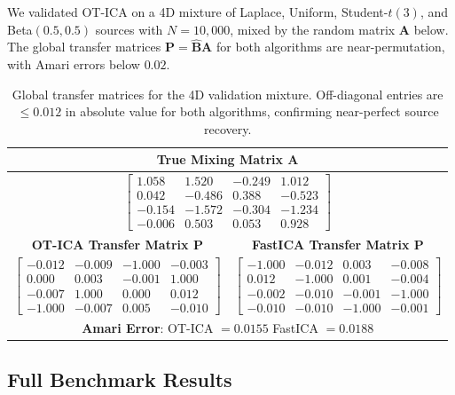\documentclass[accepted]{tpm2026} %
\begin{document}
We validated OT-ICA on a 4D mixture of Laplace, Uniform, Student-$t(3)$, and Beta$(0.5, 0.5)$ sources with $N=10{,}000$, mixed by the random matrix $\mathbf{A}$ below. The global transfer matrices $\mathbf{P} = \hat{\mathbf{B}}\mathbf{A}$ for both algorithms are near-permutation, with Amari errors below $0.02$.

\begin{table}[htbp]
\centering
\small
\begin{tabular}{cc}
\toprule
\multicolumn{2}{c}{\textbf{True Mixing Matrix $\mathbf{A}$}} \\
\midrule
\multicolumn{2}{c}{$\begin{bmatrix}
 1.058 &  1.520 & -0.249 &  1.012 \\
 0.042 & -0.486 &  0.388 & -0.523 \\
-0.154 & -1.572 & -0.304 & -1.234 \\
-0.006 &  0.503 &  0.053 &  0.928
\end{bmatrix}$} \\
\midrule
\textbf{OT-ICA Transfer Matrix $\mathbf{P}$} & \textbf{FastICA Transfer Matrix $\mathbf{P}$} \\
\midrule
$\begin{bmatrix}
-0.012 & -0.009 & -1.000 & -0.003 \\
 0.000 &  0.003 & -0.001 &  1.000 \\
-0.007 &  1.000 &  0.000 &  0.012 \\
-1.000 & -0.007 &  0.005 & -0.010
\end{bmatrix}$
&
$\begin{bmatrix}
-1.000 & -0.012 &  0.003 & -0.008 \\
 0.012 & -1.000 &  0.001 & -0.004 \\
-0.002 & -0.010 & -0.001 & -1.000 \\
-0.010 & -0.010 & -1.000 & -0.001
\end{bmatrix}$ \\
\midrule
\multicolumn{2}{c}{\textbf{Amari Error}: OT-ICA $= 0.0155$ \quad FastICA $= 0.0188$} \\
\bottomrule
\end{tabular}
\caption{Global transfer matrices for the 4D validation mixture. Off-diagonal entries are $\leq 0.012$ in absolute value for both algorithms, confirming near-perfect source recovery.}
\label{tab:baseline_matrices}
\end{table}

\subsection{Full Benchmark Results}
\label{app:full_results}
\end{document}
